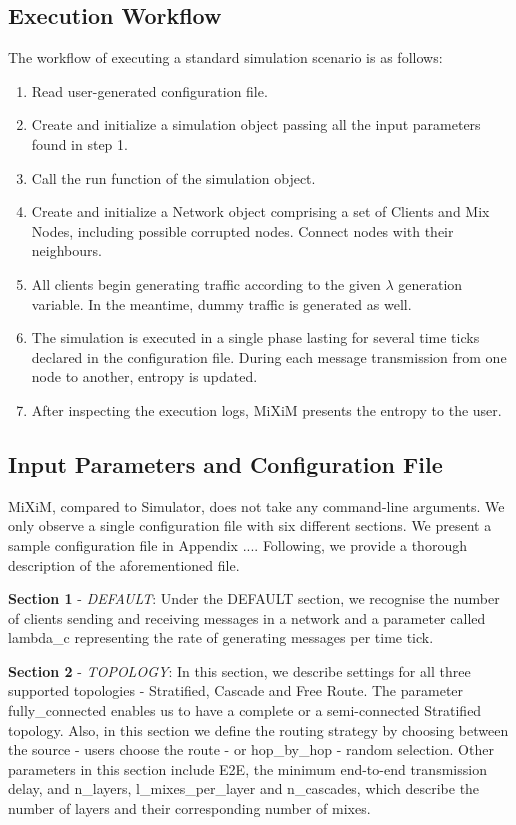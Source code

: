 \documentclass[logo,msc,cyber]{infthesis}   %
\begin{document}
\subsection{Execution Workflow}

The workflow of executing a standard simulation scenario is as follows:

\begin{enumerate}
    \item Read user-generated configuration file.
    \item Create and initialize a simulation object passing all the input
    parameters found in step 1.
    \item Call the run function of the simulation object.
    \item Create and initialize a Network object comprising a set of Clients and
    Mix Nodes, including possible corrupted nodes. Connect nodes with their
    neighbours.
    \item All clients begin generating traffic according to the given $\lambda$
    generation variable. In the meantime, dummy traffic is generated as well.
    \item The simulation is executed in a single phase lasting for several time
    ticks declared in the configuration file. During each message transmission
    from one node to another, entropy is updated.
    \item After inspecting the execution logs, MiXiM presents the entropy to the user.
\end{enumerate}

\subsection{Input Parameters and Configuration File}

MiXiM, compared to Simulator, does not take any command-line arguments. We only
observe a single configuration file with six different sections. We present a
sample configuration file in Appendix .... Following, we provide a thorough
description of the aforementioned file.

\textbf{Section 1} - \emph{DEFAULT}: Under the DEFAULT section, we recognise
the number of clients sending and receiving messages in a network and a
parameter called lambda\_c representing the rate of generating messages per time
tick. 

\textbf{Section 2} - \emph{TOPOLOGY}: In this section, we describe settings for
all three supported topologies - Stratified, Cascade and Free Route. The
parameter fully\_connected enables us to have a complete or a semi-connected
Stratified topology. Also, in this section we define the routing strategy by
choosing between the source - users choose the route - or hop\_by\_hop - random
selection. Other parameters in this section include E2E, the minimum end-to-end
transmission delay, and n\_layers, l\_mixes\_per\_layer and n\_cascades, which
describe the number of layers and their corresponding number of mixes.
\end{document}
